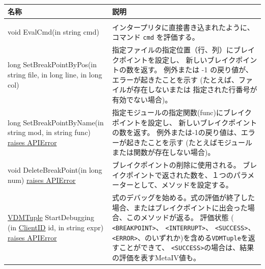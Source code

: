 \documentclass[\pformat,12pt]{jarticle}
\newcommand{\pbs}[1]{\let\temp=\\#1\let\\=\temp}
\newenvironment{interfacetable}{%
  \begin{longtable}{|>{\pbs\raggedright\ttfamily}p{6.6cm}%
                    |>{\pbs\raggedright}p{6.6cm}|} \hline
  \textrm{\bfseries 名称} &  \textbf{説明} \\ \hline
  \endhead
  }{\end{longtable}}
\newcommand{\APIError}{\hyperlink{exception.APIError}{raises APIError}}
\newcommand{\ClientID}{\hyperlink{type.ClientID}{ClientID}}
\newcommand{\VDMTuple}{\hyperlink{interface.VDMTuple}{VDMTuple}}
\begin{document}
\begin{interfacetable}
\\ \hline
void EvalCmd(in string cmd) 
  & インタープリタに直接書き込まれたように、コマンド \texttt{cmd} を評価する。    
\\ \hline
long SetBreakPointByPos(in string file, in long line, in long col) 
  & 指定ファイルの指定位置（行、列）にブレイクポイントを設定し、
    新しいブレイクポイントの数を返す。
    例外または -1 の戻り値が、エラーが起きたことを示す
    (たとえば、ファイルが存在しないまたは
    指定された行番号が有効でない場合)。
\\ \hline
long SetBreakPointByName(in string mod, in string func) \APIError
  & 指定モジュールの指定関数(func)にブレイクポイントを設定し、
  新しいブレイクポイントの数を返す。
  例外または-1の戻り値は、エラーが起きたことを示す
  (たとえばモジュールまたは関数が存在しない場合)。
\\ \hline
void DeleteBreakPoint(in long num) \APIError
  & ブレイクポイントの削除に使用される。
  ブレイクポイントで返された数を、１つのパラメーターとして、メソッドを設定する。
\\ \hline
{\VDMTuple} StartDebugging (in {\ClientID} id, in string expr) \APIError 
  & 式のデバッグを始める。式の評価が終了した場合、またはブレイクポイントに出会った場合、このメソッドが返る。
 評価状態 ( {\tt <BREAKPOINT>}、 {\tt <INTERRUPT>}、 {\tt <SUCCESS>}、 {\tt <ERROR>}、のいずれか)を含める{\tt VDMTuple}を返すことができて、 {\tt <SUCCESS>}の場合は、結果の評価を表すMetaIV値も。


\end{interfacetable}
\end{document}
